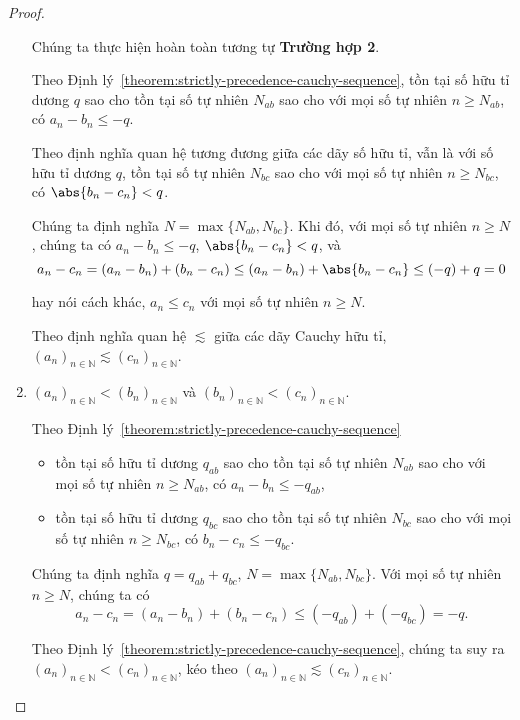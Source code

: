 \begin{proof}
\begin{enumerate}[label={\textbf{Trường hợp \arabic*.}},itemindent=2cm]
              Chúng ta thực hiện hoàn toàn tương tự \textbf{Trường hợp 2}.

              Theo Định lý~\ref{theorem:strictly-precedence-cauchy-sequence}, tồn tại số hữu tỉ dương $q$ sao cho tồn tại số tự nhiên $N_{ab}$ sao cho với mọi số tự nhiên $n\geq N_{ab}$, có $a_{n} - b_{n}\leq -q$.

              Theo định nghĩa quan hệ tương đương giữa các dãy số hữu tỉ, vẫn là với số hữu tỉ dương $q$, tồn tại số tự nhiên $N_{bc}$ sao cho với mọi số tự nhiên $n\geq N_{bc}$, có $\abs{b_{n} - c_{n}} < q$.

              Chúng ta định nghĩa $N = \max\{ N_{ab}, N_{bc} \}$. Khi đó, với mọi số tự nhiên $n\geq N$, chúng ta có $a_{n} - b_{n}\leq -q$, $\abs{b_{n} - c_{n}} < q$, và
              \[
                  a_{n} - c_{n} = (a_{n} - b_{n}) + (b_{n} - c_{n})\leq (a_{n} - b_{n}) + \abs{b_{n} - c_{n}}\leq (-q) + q = 0
              \]

              hay nói cách khác, $a_{n}\leq c_{n}$ với mọi số tự nhiên $n\geq N$.

              Theo định nghĩa quan hệ $\lesssim$ giữa các dãy Cauchy hữu tỉ, ${(a_{n})}_{n\in\mathbb{N}}\lesssim {(c_{n})}_{n\in\mathbb{N}}$.
        \item ${(a_{n})}_{n\in\mathbb{N}} < {(b_{n})}_{n\in\mathbb{N}}$ và ${(b_{n})}_{n\in\mathbb{N}} < {(c_{n})}_{n\in\mathbb{N}}$.

              Theo Định lý~\ref{theorem:strictly-precedence-cauchy-sequence}
              \begin{itemize}
                  \item tồn tại số hữu tỉ dương $q_{ab}$ sao cho tồn tại số tự nhiên $N_{ab}$ sao cho với mọi số tự nhiên $n\geq N_{ab}$, có $a_{n} - b_{n}\leq -q_{ab}$,
                  \item tồn tại số hữu tỉ dương $q_{bc}$ sao cho tồn tại số tự nhiên $N_{bc}$ sao cho với mọi số tự nhiên $n\geq N_{bc}$, có $b_{n} - c_{n}\leq -q_{bc}$.
              \end{itemize}

              Chúng ta định nghĩa $q = q_{ab} + q_{bc}$, $N = \max\{ N_{ab}, N_{bc} \}$. Với mọi số tự nhiên $n\geq N$, chúng ta có
              \[
                  a_{n} - c_{n} = (a_{n} - b_{n}) + (b_{n} - c_{n}) \leq (-q_{ab}) + (-q_{bc}) = -q.
              \]

              Theo Định lý~\ref{theorem:strictly-precedence-cauchy-sequence}, chúng ta suy ra ${(a_{n})}_{n\in\mathbb{N}} < {(c_{n})}_{n\in\mathbb{N}}$, kéo theo ${(a_{n})}_{n\in\mathbb{N}}\lesssim {(c_{n})}_{n\in\mathbb{N}}$.
    \end{enumerate}


\end{proof}
